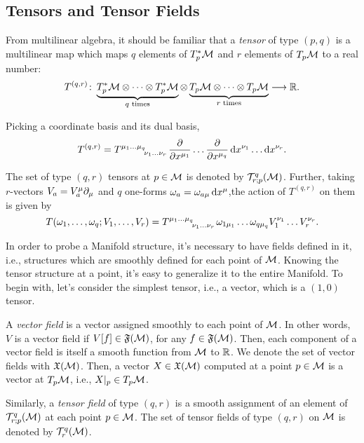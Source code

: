\subsection{Tensors and Tensor Fields}
From multilinear algebra, it should be familiar that a \emph{tensor} of type $(p,q)$ is a multilinear map which maps $q$ elements of $T^*_p \mathcal{M}$ and $r$ elements of $T_p \mathcal{M}$ to a real number:
\begin{equation}
    T^{(q,r)} \colon 
    \underbrace{T^*_p \mathcal{M} \otimes \dots \otimes T^*_p \mathcal{M}}_\text{$q$ times}
    \otimes
    \underbrace{T_p \mathcal{M} \otimes \dots \otimes T_p \mathcal{M}}_\text{$r$ times} \longrightarrow \mathbb{R}.
\end{equation}

Picking a coordinate basis and its dual basis,
\begin{equation}
    T^{(q,r)} = \tensor{T}{^{\mu_1}^\dots^{\mu_q}_{\nu_1}_\dots_{\nu_r}} \frac{\de}{\de x^{\mu_1}} \dots \frac{\de}{\de x^{\mu_q}} \ud x^{\nu_1} \dots \ud x^{\nu_r}.
\end{equation}

The set of type $(q,r)$ tensors at $p \in \mathcal{M}$ is denoted by $\mathcal{T}^q_{r;p}(\mathcal{M})$. Further, taking $r$-vectors $V_a = V_a^\mu \partial_\mu$ and $q$ one-forms $\omega_a = \omega_{a\mu} \mathop{}\!\mathrm{d} x^\mu$,the action of $T^{(q,r)}$ on them is given by
\begin{equation}
    T(\omega_1, \dots, \omega_q; V_1, \dots, V_r) = \tensor{T}{^{\mu_1}^\dots^{\mu_q}_{\nu_1}_\dots_{\nu_r}} \omega_{1\mu_1} \dots \omega_{q\mu_q} V_1^{\nu_1} \dots V_r^{\nu_r}.
\end{equation}

In order to probe a Manifold structure, it's necessary to have fields defined in it, i.e., structures which are smoothly defined for each point of $\mathcal{M}$. Knowing the tensor structure at a point, it's easy to generalize it to the entire Manifold. To begin with, let's consider the simplest tensor, i.e., a vector, which is a $(1,0)$ tensor.

A \emph{vector field} is a vector assigned smoothly to each point of $\mathcal{M}$. In other words, $V$ is a vector field if $V[f] \in \mathfrak{F}(\mathcal{M})$, for any $f \in \mathfrak{F}(\mathcal{M})$. Then, each component of a vector field is itself a smooth function from $\mathcal{M}$ to $\mathbb{R}$. We denote the set of vector fields with $\mathfrak{X}(\mathcal{M})$. Then, a vector $X \in \mathfrak{X}(\mathcal{M})$ computed at a point $p \in \mathcal{M}$ is a vector at $T_p \mathcal{M}$, i.e., $X|_p \in T_p \mathcal{M}$.

Similarly, a \emph{tensor field} of type $(q,r)$ is a smooth assignment of an element of $\mathcal{T}^q_{r;p}(\mathcal{M})$ at each point $p \in \mathcal{M}$. The set of tensor fields of type $(q,r)$ on $\mathcal{M}$ is denoted by $\mathcal{T}^q_r(\mathcal{M})$.


